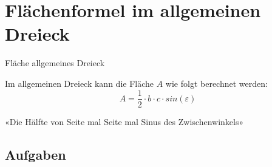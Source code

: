 
\newpage
\section{Flächenformel im allgemeinen
Dreieck}





\begin{gesetz}{Fläche allgemeines Dreieck}{}
  
Im allgemeinen Dreieck kann die Fläche $A$ wie folgt berechnet werden: 
$$A = \frac{1}{2}\cdot{}b\cdot{}c\cdot{}sin(\varepsilon)$$

«Die Hälfte von Seite mal Seite mal Sinus des Zwischenwinkels»

\end{gesetz}
\newpage


\subsection*{Aufgaben}
\newpage

